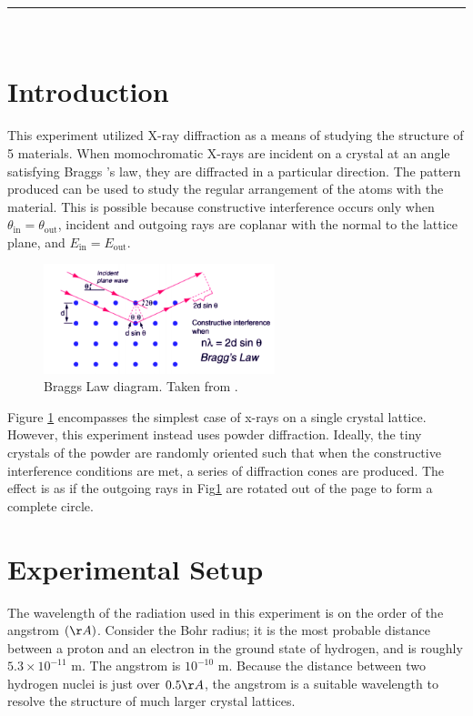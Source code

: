 \documentclass[12pt]{article}
\makeatletter
\newcommand{\partition}{\rule{\linewidth}{0.8pt}}
\renewcommand{\maketitle}{
\begin{center}
\@date \hfill  \@author\\
{\Large \textsc{\@title}}
\partition\\
\end{center}
}
\makeatother
\begin{document}
\maketitle
\linespread{1.5}
\section{Introduction}
\noindent
This experiment utilized X-ray diffraction as a means of studying the structure of 5 materials. When momochromatic X-rays are incident on a crystal at an angle satisfying Braggs 's law, they are diffracted in a particular direction. The pattern produced can be used to study the regular arrangement of the atoms with the material. This is possible because constructive interference occurs only when $\theta_{\text{in}} = \theta_{\text{out}}$,  incident and outgoing rays are coplanar with the normal to the lattice plane, and $E_{\text{in}} = E_{\text{out}}$.
\begin{figure}[h!]\centering
 \quad \includegraphics[width=0.6\textwidth]{bragg}
\caption{Braggs Law diagram. Taken from \cite{manual}.}
\label{fig:bragg}
\end{figure} 

\noindent
Figure \ref{fig:bragg} encompasses the simplest case of x-rays on a single crystal lattice. However, this experiment instead uses powder diffraction. Ideally, the tiny crystals of the powder are randomly oriented such that when the constructive interference conditions are met, a series of diffraction cones are produced. The effect is as if the outgoing rays in Fig\ref{fig:bragg} are rotated out of the page to form a complete circle. 

\section{Experimental Setup}
The wavelength of the radiation used in this experiment is on the order of the angstrom $(\AA)$. Consider the Bohr radius; it is the most probable distance between a proton and an electron in the ground state of hydrogen, and is roughly $5.3\times 10^{-11}$ m. The angstrom is  $10^{-10}$ m. Because the distance between two hydrogen nuclei is just over $0.5\AA$, the angstrom is a suitable wavelength to resolve the structure of much larger crystal lattices. 
\end{document}
